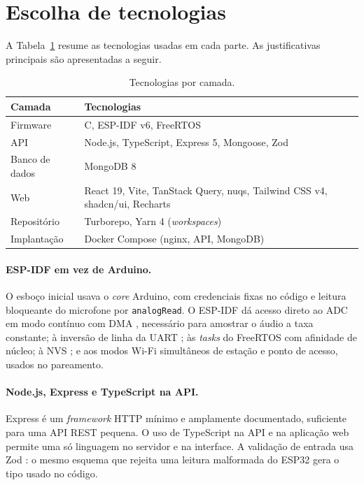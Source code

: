 \section{Escolha de tecnologias}
\label{sec:stack}

A Tabela~\ref{tab:stack} resume as tecnologias usadas em cada parte. As justificativas principais são apresentadas a seguir.

\begin{table}[!ht]
\caption{Tecnologias por camada.}
\label{tab:stack}
\centering
\small
\begin{tabularx}{\linewidth}{>{\hsize=0.621\hsize\raggedright\arraybackslash}X>{\hsize=1.379\hsize\raggedright\arraybackslash}X}
\toprule
\textbf{Camada} & \textbf{Tecnologias} \\
\midrule
Firmware & C, ESP-IDF v6, FreeRTOS \\
API & Node.js, TypeScript, Express 5, Mongoose, Zod \\
Banco de dados & MongoDB 8 \\
Web & React 19, Vite, TanStack Query, nuqs, Tailwind CSS v4, shadcn/ui, Recharts \\
Repositório & Turborepo, Yarn 4 (\textit{workspaces}) \\
Implantação & Docker Compose (nginx, API, MongoDB) \\
\bottomrule
\end{tabularx}
\end{table}

\paragraph{ESP-IDF em vez de Arduino.}
O esboço inicial usava o \textit{core} Arduino, com credenciais fixas no código e leitura bloqueante do microfone por \texttt{analogRead}. O ESP-IDF \citep{espidf} dá acesso direto ao ADC em modo contínuo com DMA \citep{espidfadc}, necessário para amostrar o áudio a taxa constante; à inversão de linha da UART \citep{espidfuart}; às \textit{tasks} do FreeRTOS com afinidade de núcleo; à NVS \citep{espidfnvs}; e aos modos Wi-Fi simultâneos de estação e ponto de acesso, usados no pareamento.

\paragraph{Node.js, Express e TypeScript na API.}
Express \citep{express} é um \textit{framework} HTTP mínimo e amplamente documentado, suficiente para uma API REST pequena. O uso de TypeScript \citep{typescript} na API e na aplicação web permite uma só linguagem no servidor e na interface. A validação de entrada usa Zod \citep{zod}: o mesmo esquema que rejeita uma leitura malformada do ESP32 gera o tipo usado no código.

